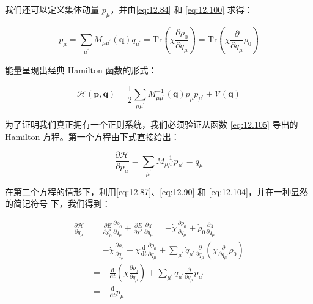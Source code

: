 我们还可以定义集体动量 $p_{\mu}$，并由\ref{eq:12.84} 和 \ref{eq:12.100} 求得：

\begin{equation}
p_{\mu}=\sum_{\mu^{\prime}}M_{\mu\mu^{\prime}}(\boldsymbol{q})\dot{q}_{\mu^{\prime}}=\mathrm{Tr}\left(\chi\frac{\partial\rho_{0}}{\partial q_{\mu}}\right)=\mathrm{Tr}\left(\chi\frac{\partial}{\partial q_{\mu}}\rho_{0}\right)\label{eq:12.104}
\end{equation}

能量呈现出经典 Hamilton 函数的形式：

\begin{equation}
\mathcal{H}(\boldsymbol{p},\boldsymbol{q})=\frac{1}{2}\sum_{\mu\mu^{\prime}}M^{-1}_{\mu\mu^{\prime}}(\boldsymbol{q})p_{\mu}p_{\mu^{\prime}}+\mathcal{V}(\boldsymbol{q})\label{eq:12.105}
\end{equation}

为了证明我们真正拥有一个正则系统，我们必须验证从函数 \ref{eq:12.105} 导出的 Hamilton 方程。第一个方程由下式直接给出：

\begin{equation}
\frac{\partial\mathcal{H}}{\partial p_{\mu}}=\sum_{\mu^{\prime}}M^{-1}_{\mu\mu^{\prime}}p_{\mu^{\prime}}=\dot{q}_{\mu}\label{eq:12.106}
\end{equation}

在第二个方程的情形下，利用\ref{eq:12.87}、\ref{eq:12.90} 和 \ref{eq:12.104}，并在一种显然的简记符号
\cite{BGV76} 下，我们得到：

\begin{align}
\frac{\partial\mathcal{H}}{\partial q_{\mu}} & =\frac{\partial E}{\partial\rho^{*}_{0}}\frac{\partial\rho_{0}}{\partial q_{\mu}}+\frac{\partial E}{\partial\chi^{*}}\frac{\partial\chi}{\partial q_{\mu}}=-\dot{\chi}\frac{\partial\rho_{0}}{\partial q_{\mu}}+\dot{\rho}_{0}\frac{\partial\chi}{\partial q_{\mu}}\nonumber \\
 & =-\dot{\chi}\frac{\partial\rho_{0}}{\partial q_{\mu}}-\chi\frac{\mathrm{d}}{\mathrm{d}t}\frac{\partial\rho_{0}}{\partial q_{\mu}}+\sum_{\mu^{\prime}}\dot{q}_{\mu^{\prime}}\frac{\partial}{\partial q_{\mu}}\left(\chi\frac{\partial}{\partial q_{\mu^{\prime}}}\rho_{0}\right)\nonumber \\
 & =-\frac{\mathrm{d}}{\mathrm{d}t}\left(\chi\frac{\partial\rho_{0}}{\partial q_{\mu}}\right)+\sum_{\mu^{\prime}}\dot{q}_{\mu^{\prime}}\frac{\partial}{\partial q_{\mu}}p_{\mu^{\prime}}\nonumber \\
 & =-\frac{\mathrm{d}}{\mathrm{d}t}p_{\mu}\label{eq:12.107}
\end{align}

